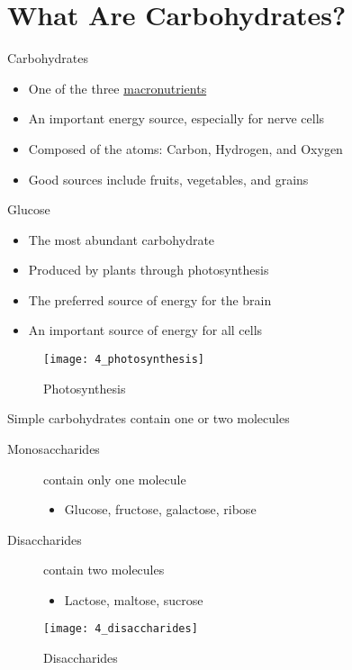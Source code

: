 \documentclass[title={Chapter 4}]{fdsn201notes}
\begin{document}

\section{What Are Carbohydrates?}\label{sec:what-are-carbohydrates?}
Carbohydrates
\begin{itemize}
	\item One of the three \hyperref[dfn:macronutrients]{macronutrients}
	\item An important energy source, especially for nerve cells
	\item Composed of the atoms: Carbon, Hydrogen, and Oxygen
	\item Good sources include fruits, vegetables, and grains
\end{itemize}

Glucose
\begin{itemize}
	\item The most abundant carbohydrate
	\item Produced by plants through photosynthesis
	\item The preferred source of energy for the brain
	\item An important source of energy for all cells
\end{itemize}

\begin{figure}[H]
	\centering
	\texttt{[image: 4\_photosynthesis]}
	\caption{Photosynthesis}
	\label{fig:photosynthesis}
\end{figure}

Simple carbohydrates contain one or two molecules
\begin{description}
	\item[Monosaccharides] contain only one molecule
	\begin{itemize}
		\item Glucose, fructose, galactose, ribose
	\end{itemize}
	\item[Disaccharides] contain two molecules
	\begin{itemize}
		\item Lactose, maltose, sucrose
	\end{itemize}
\end{description}

\begin{figure}[H]
	\centering
	\texttt{[image: 4\_disaccharides]}
	\caption{Disaccharides}
	\label{fig:disaccharides}
\end{figure}
\end{document}
